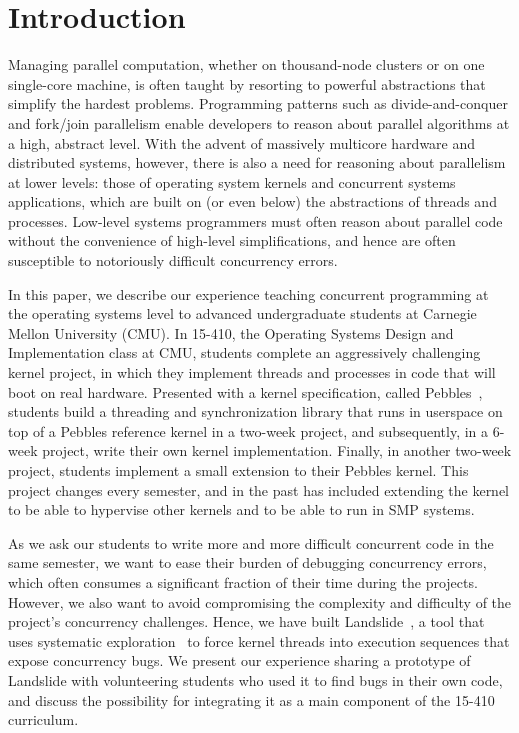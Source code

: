 \section{Introduction}

Managing parallel computation, whether on thousand-node clusters or on one single-core machine, is often taught by resorting to powerful abstractions that simplify the hardest problems.
Programming patterns such as divide-and-conquer and fork/join parallelism enable developers to reason about parallel algorithms at a high, abstract level.
With the advent of massively multicore hardware and distributed systems, however, there is also a need for reasoning about parallelism at lower levels: those of operating system kernels and concurrent systems applications, which are built on (or even below) the abstractions of threads and processes.
Low-level systems programmers must often reason about parallel code without the convenience of high-level simplifications, and hence are often susceptible to notoriously difficult concurrency errors.

In this paper, we describe our experience teaching concurrent programming at the operating systems level to advanced undergraduate students at Carnegie Mellon University (CMU).
In 15-410, the Operating Systems Design and Implementation class at CMU, students complete an aggressively challenging kernel project, in which they implement threads and processes in code that will boot on real hardware.
Presented with a kernel specification, called Pebbles~\cite{kspec}, students build a threading and synchronization library that runs in userspace on top of a Pebbles reference kernel in a two-week project, and subsequently, in a 6-week project, write their own kernel implementation.
Finally, in another two-week project, students implement a small extension to their Pebbles kernel. This project changes every semester, and in the past has included extending the kernel to be able to hypervise other kernels and to be able to run in SMP systems.

As we ask our students to write more and more difficult concurrent code in the same semester, we want to ease their burden of debugging concurrency errors, which often consumes a significant fraction of their time during the projects.
However, we also want to avoid compromising the complexity and difficulty of the project's concurrency challenges. %
Hence, we have built Landslide~\cite{landslide}, a tool that uses systematic exploration~\cite{verisoft} to force kernel threads into execution sequences that expose concurrency bugs.
We present our experience sharing a prototype of Landslide with volunteering students who used it to find bugs in their own code, and discuss the possibility for integrating it as a main component of the 15-410 curriculum.

